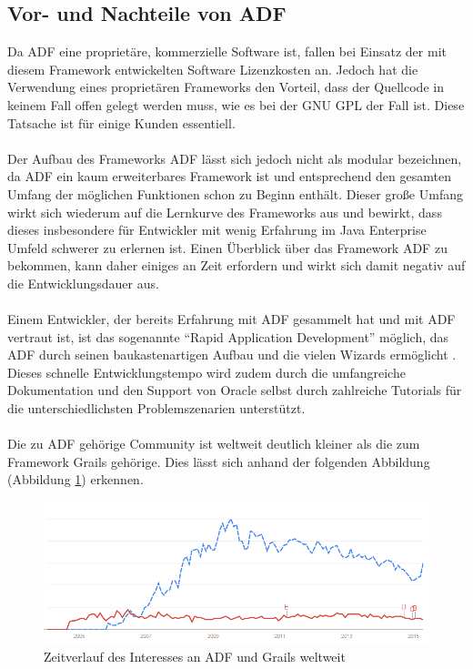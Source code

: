 \subsection{Vor- und Nachteile von ADF}
\label{sec:adf-vor-nach}
Da ADF eine proprietäre, kommerzielle Software ist, fallen bei Einsatz der mit diesem Framework entwickelten Software Lizenzkosten an. Jedoch hat die Verwendung eines proprietären Frameworks den Vorteil, dass der Quellcode in keinem Fall offen gelegt werden muss, wie es bei der GNU GPL\autocite{GNU2015} der Fall ist. Diese Tatsache ist für einige Kunden essentiell. \\\\
Der Aufbau des Frameworks ADF lässt sich jedoch nicht als modular bezeichnen, da ADF ein kaum erweiterbares Framework ist und entsprechend den gesamten Umfang der möglichen Funktionen schon zu Beginn enthält. Dieser große Umfang wirkt sich wiederum auf die Lernkurve des Frameworks aus und bewirkt, dass dieses insbesondere für Entwickler mit wenig Erfahrung im Java Enterprise Umfeld schwerer zu erlernen ist\autocite[S.24]{AUW2009}. Einen Überblick über das Framework ADF zu bekommen, kann daher einiges an Zeit erfordern und wirkt sich damit negativ auf die Entwicklungsdauer aus. \\\\
Einem Entwickler, der bereits Erfahrung mit ADF gesammelt hat und mit ADF vertraut ist, ist das sogenannte "`Rapid Application Development"' möglich, das ADF durch seinen baukastenartigen Aufbau und die vielen Wizards ermöglicht \autocite[S.3]{ARIA2015}. Dieses schnelle Entwicklungstempo wird zudem durch die umfangreiche Dokumentation und den Support von Oracle selbst durch zahlreiche Tutorials für die unterschiedlichsten Problemszenarien unterstützt. \\\\
Die zu ADF gehörige Community ist weltweit deutlich kleiner als die zum Framework Grails gehörige. Dies lässt sich anhand der folgenden Abbildung (Abbildung \ref{fig:gt15}) erkennen. 
\begin{figure}[h]
\centering
\includegraphics[width=\textwidth]{img/interesse_zeitl.png}
\caption{Zeitverlauf des Interesses an ADF und Grails weltweit \autocite{GT2015} }
\label{fig:gt15}
\end{figure}

